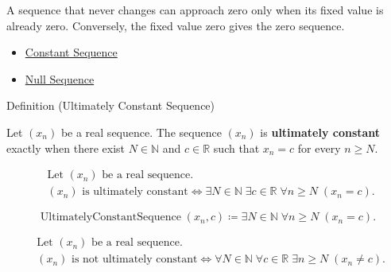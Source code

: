 \begin{remark*}[Interpretation]
A sequence that never changes can approach zero only when its fixed value is
already zero. Conversely, the fixed value zero gives the zero sequence.
\end{remark*}

\begin{dependencies}
\begin{itemize}
  \item \hyperref[def:constant-sequence]{Constant Sequence}
  \item \hyperref[def:null-sequence]{Null Sequence}
\end{itemize}
\end{dependencies}


\begin{definitionbox}{Definition (Ultimately Constant Sequence)}
\begin{definition}
\label{def:ultimately-constant-sequence}
Let $(x_n)$ be a real sequence. The sequence $(x_n)$ is
\textbf{ultimately constant} exactly when there exist $N \in \mathbb{N}$ and
$c \in \mathbb{R}$ such that $x_n = c$ for every $n \ge N$.
\end{definition}
\end{definitionbox}

\begin{remark*}
\[
\begin{aligned}
&\text{Let } (x_n) \text{ be a real sequence.}\\
&(x_n) \text{ is ultimately constant}
\Longleftrightarrow
\exists N \in \mathbb{N}\;
\exists c \in \mathbb{R}\;
\forall n \ge N\;(x_n = c).
\end{aligned}
\]
\end{remark*}

\begin{remark*}
\[
\operatorname{UltimatelyConstantSequence}(x_n,c)
\coloneqq
\exists N \in \mathbb{N}\;
\forall n \ge N\;(x_n = c).
\]
\end{remark*}

\begin{remark*}
\[
\begin{aligned}
&\text{Let } (x_n) \text{ be a real sequence.}\\
&(x_n) \text{ is not ultimately constant}
\Longleftrightarrow
\forall N \in \mathbb{N}\;
\forall c \in \mathbb{R}\;
\exists n \ge N\;(x_n \neq c).
\end{aligned}
\]
\end{remark*}


